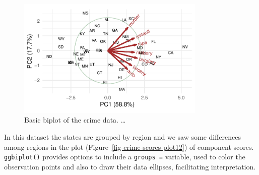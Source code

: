 \documentclass[
  letterpaper,
  10pt,
  krantz2]{krantz}
\makeatletter
\newenvironment{Shaded}{\begin{snugshade}}{\end{snugshade}}
\newcommand{\AttributeTok}[1]{\textcolor[rgb]{0.40,0.45,0.13}{#1}}
\newcommand{\ConstantTok}[1]{\textcolor[rgb]{0.56,0.35,0.01}{#1}}
\newcommand{\DecValTok}[1]{\textcolor[rgb]{0.68,0.00,0.00}{#1}}
\newcommand{\FloatTok}[1]{\textcolor[rgb]{0.68,0.00,0.00}{#1}}
\newcommand{\FunctionTok}[1]{\textcolor[rgb]{0.28,0.35,0.67}{#1}}
\newcommand{\NormalTok}[1]{\textcolor[rgb]{0.00,0.23,0.31}{#1}}
\newcommand{\SpecialCharTok}[1]{\textcolor[rgb]{0.37,0.37,0.37}{#1}}
\newcommand{\StringTok}[1]{\textcolor[rgb]{0.13,0.47,0.30}{#1}}
\newenvironment{kframe}{%
  \medskip{}
  \setlength{\fboxsep}{.8em}
  \def\at@end@of@kframe{}%
  \ifinner\ifhmode%
  \def\at@end@of@kframe{\end{minipage}}%
  \begin{minipage}{\columnwidth}%
  \fi\fi%
  \def\FrameCommand##1{\hskip\@totalleftmargin \hskip-\fboxsep
  \colorbox{shadecolor}{##1}\hskip-\fboxsep
      \hskip-\linewidth \hskip-\@totalleftmargin \hskip\columnwidth}%
  \MakeFramed {\advance\hsize-\width
    \@totalleftmargin\z@ \linewidth\hsize
    \@setminipage}}%
{\par\unskip\endMakeFramed%
  \at@end@of@kframe}
\renewenvironment{Shaded}{\begin{kframe}}{\end{kframe}}
\makeatother
\begin{document}
\begin{figure}[H]

{\centering \includegraphics[width=0.8\textwidth,height=\textheight]{figs/ch04/fig-crime-biplot1-1.pdf}

}

\caption{\label{fig-crime-biplot1}Basic biplot of the crime data.
\ldots{}}

\end{figure}

In this dataset the states are grouped by region and we saw some
differences among regions in the plot
(Figure~\ref{fig-crime-scores-plot12}) of component scores.
\texttt{ggbiplot()} provides options to include a \texttt{groups\ =}
variable, used to color the observation points and also to draw their
data ellipses, facilitating interpretation.

\begin{Shaded}
\end{Shaded}
\end{document}
